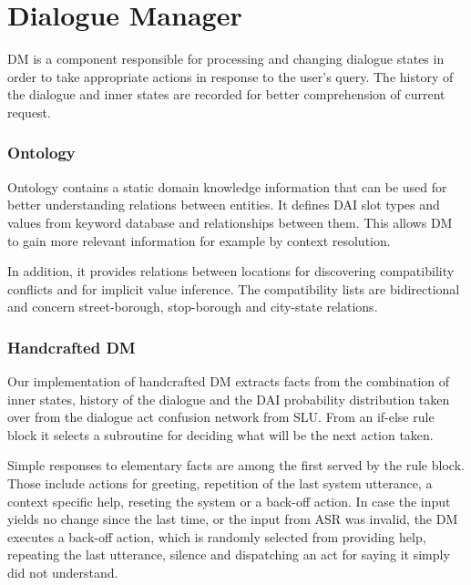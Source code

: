 \section{Dialogue Manager}

\acf{DM} is a component responsible for processing and changing dialogue states in order to take appropriate actions in response to the user's query.
The history of the dialogue and inner states are recorded for better comprehension of current request.

\subsubsection{Ontology}

Ontology contains a static domain knowledge information that can be used for better understanding relations between entities.
It defines \ac{DAI} slot types and values from keyword database and relationships between them.
This allows \ac{DM} to gain more relevant information for example by context resolution.

In addition, it provides relations between locations for discovering compatibility conflicts and for implicit value inference.
The compatibility lists are bidirectional and concern street-borough, stop-borough and city-state relations.

\subsubsection{Handcrafted \ac{DM}}

Our implementation of handcrafted \ac{DM} extracts facts from the combination of inner states, history of the dialogue and the \ac{DAI} probability distribution taken over from the dialogue act confusion network from \ac{SLU}.
From an if-else rule block it selects a subroutine for deciding what will be the next action taken.

Simple responses to elementary facts are among the first served by the rule block.
Those include actions for greeting, repetition of the last system utterance, a context specific help, reseting the system or a back-off action.
In case the input yields no change since the last time, or the input from \ac{ASR} was invalid, the \ac{DM} executes a back-off action, which is randomly selected from providing help, repeating the last utterance, silence and dispatching an act for saying it simply did not understand.

